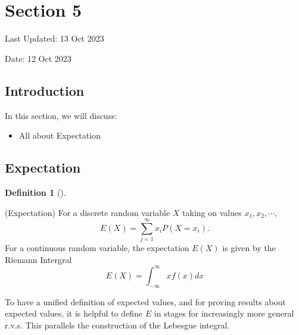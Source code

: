 \documentclass[
  letterpaper,
  DIV=11,
  numbers=noendperiod]{scrreprt}
\providecommand{\tightlist}{%
  \setlength{\itemsep}{0pt}\setlength{\parskip}{0pt}}\usepackage{longtable,booktabs,array}
\theoremstyle{plain}
\theoremstyle{definition}
\newtheorem{definition}{Definition}[chapter]
\theoremstyle{remark}
\begin{document}

\hypertarget{section-5}{%
\chapter*{Section 5}\label{section-5}}


Last Updated: 13 Oct 2023

Date: 12 Oct 2023

\hypertarget{introduction-4}{%
\section*{Introduction}\label{introduction-4}}


In this section, we will discuss:

\begin{itemize}
\tightlist
\item
  All about Expectation
\end{itemize}

\hypertarget{expectation}{%
\section*{Expectation}\label{expectation}}


\leavevmode{}%
\begin{definition}[]\label{def-expectation}

(Expectation) For a discrete random variable \(X\) taking on values
\(x_1, x_2, \cdots\), \[E(X)=\sum_{j=1}^{\infty} x_i P(X=x_i).\] For a
continuous random variable, the expectation \(E(X)\) is given by the
Riemann Intergral \[E(X)= \int_{-\infty}^{\infty} xf(x) dx\]

\end{definition}

To have a unified definition of expected values, and for proving results
about expected values, it is helpful to define \(E\) in stages for
increasingly more general r.v.s. This parallels the construction of the
Lebesgue integral.
\end{document}
